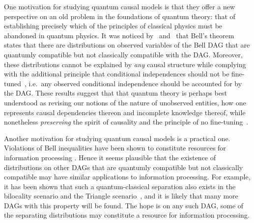 {One motivation for studying quantum causal models is that they offer a new perspective on an old  problem in the foundations of quantum theory: that of establishing precisely which of the principles of classical physics must be abandoned in quantum physics. It was noticed by~\citet{fritz2012bell} and~\citet{WoodSpekkens} that Bell's theorem~\cite{bell1966lhvm} states that there are distributions on observed variables of the Bell DAG that are quantumly compatible but not classically compatible with the DAG. Moreover, these distributions cannot be explained by \emph{any} causal structure while complying with the additional principle that conditional independences should not be fine-tuned~\cite{WoodSpekkens}, i.e.~any observed conditional independence should be accounted for by the DAG. These results suggest that  that quantum theory is perhaps best understood as revising our notions of the nature of unobserved entities, how one represents causal dependencies thereon and incomplete knowledge thereof, while 
nonetheless {\em preserving} the spirit of causality and the principle of no fine-tuning~\cite{leifer2013conditionalstates,Spekkens2015paradigm,henson2011ontic}.

Another motivation for studying quantum causal models is a practical one.  Violations of Bell inequalities have  been shown to constitute resources for information processing \cite{NoSigPolytope,scarani2012device,BancalDIApproach}. Hence it seems plausible that the existence of distributions on other DAGs that are quantumly compatible but not classically compatible may have similar applications to information processing. 
For example, it has been shown that such a quantum-classical separation also exists 
in the bilocality scenario \cite{BilocalCorrelations} and the Triangle scenario~\cite{fritz2012bell}, and it is likely that many more DAGs with this property will be found.  The hope is on any such DAG, some of the separating distributions may constitute a resource for information processing. 

}
